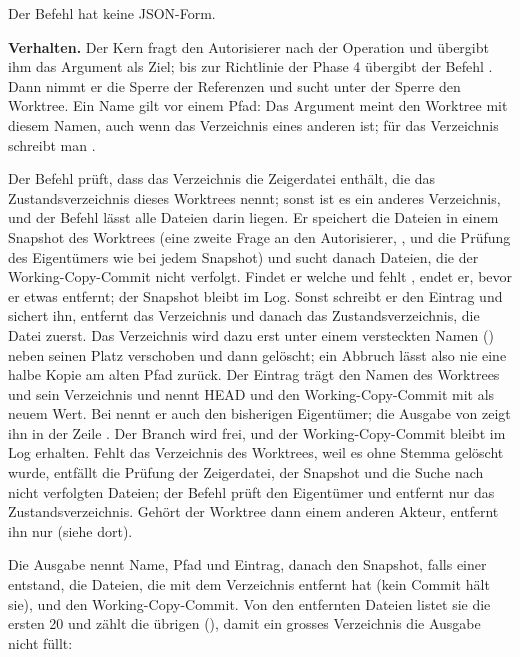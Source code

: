 Der Befehl hat keine JSON-Form.

{\bf Verhalten.} Der Kern fragt den Autorisierer nach der Operation  und
übergibt ihm das Argument als Ziel; bis zur Richtlinie der Phase 4 übergibt der Befehl
. Dann nimmt er die Sperre der Referenzen und sucht unter der Sperre den
Worktree. Ein Name gilt vor einem Pfad: Das Argument  meint den Worktree mit diesem
Namen, auch wenn  das Verzeichnis eines anderen ist; für das Verzeichnis schreibt man
.

Der Befehl prüft, dass das Verzeichnis die Zeigerdatei  enthält, die das
Zustandsverzeichnis dieses Worktrees nennt; sonst ist es ein anderes Verzeichnis, und der Befehl
lässt alle Dateien darin liegen.
Er speichert die Dateien in einem Snapshot des Worktrees (eine zweite Frage an den Autorisierer,
, und die Prüfung des Eigentümers wie bei jedem Snapshot) und sucht danach
Dateien, die der Working-Copy-Commit nicht verfolgt.
Findet er welche und fehlt , endet er, bevor er etwas entfernt; der Snapshot bleibt
im Log. Sonst schreibt er den Eintrag  und sichert ihn, entfernt das
Verzeichnis und danach das Zustandsverzeichnis, die Datei  zuerst. Das Verzeichnis
wird dazu erst unter einem versteckten Namen () neben seinen Platz
verschoben und dann gelöscht; ein Abbruch lässt also nie eine halbe Kopie am alten Pfad zurück.
Der Eintrag trägt den Namen des Worktrees und sein Verzeichnis und nennt HEAD und den
Working-Copy-Commit mit \type{-} als neuem Wert.
Bei  nennt er auch den bisherigen Eigentümer; die Ausgabe von 
zeigt ihn in der Zeile . Der Branch wird frei, und der Working-Copy-Commit
bleibt im Log erhalten.
Fehlt das Verzeichnis des Worktrees, weil es ohne Stemma gelöscht wurde, entfällt die Prüfung der
Zeigerdatei, der Snapshot und die Suche nach nicht verfolgten Dateien; der Befehl prüft den
Eigentümer und entfernt nur das Zustandsverzeichnis.
Gehört der Worktree dann einem anderen Akteur, entfernt ihn nur 
(siehe dort).

Die Ausgabe nennt Name, Pfad und Eintrag, danach den Snapshot, falls einer entstand, die Dateien,
die  mit dem Verzeichnis entfernt hat (kein Commit hält sie), und den
Working-Copy-Commit. Von den entfernten Dateien listet sie die ersten 20 und zählt die übrigen
(), damit ein grosses Verzeichnis die Ausgabe nicht füllt:

